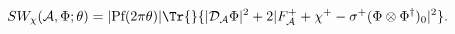 \begin{equation}\label{ncpswa-uplus}
 SW_\chi(\mathcal{A},\Phi;\theta)=|\text{Pf}(2\pi\theta)|\Tr{}
  \{|\mathcal{D}_{\mathcal{A}}\Phi|^2+2|F^+_{\mathcal{A}}+\chi^+-
  \sigma^+(\Phi\otimes\Phi^\dagger)_0|^2\}.
\end{equation}


